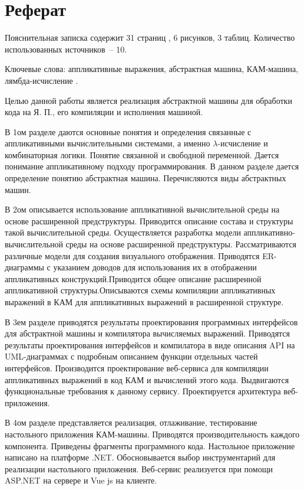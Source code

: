 \chapter*{Реферат}
\thispagestyle{plain}

Пояснительная записка содержит 31  страниц , 6 рисунков, 3 таблиц.   Количество использованных источников~-- 10.

Ключевые слова: аппликативные выражения, абстрактная машина, КАМ-машина, лямбда-исчисление .

Целью данной работы является реализация абстрактной машины для обработки кода на Я. П., его компиляции и исполнения машиной.

В 1ом разделе даются основные понятия и определения связанные с аппликативными вычислительными системами, а именно $\lambda$-исчисление и комбинаторная логики. Понятие связанной и свободной переменной.
Дается понимание аппликативному подходу программирования. В данном разделе дается определение понятию абстрактная машина. Перечисляются виды абстрактных машин.

В 2ом описывается использование аппликативной вычислительной среды на основе расширенной предструктуры. Приводится описание состава и структуры такой вычислительной среды. Осуществляется разработка модели аппликативно-вычислительной среды на основе расширенной предструктуры. Рассматриваются различные модели для создания визуального отображения. Приводятся ER-диаграммы с указанием доводов для использования их в отображении аппликативных конструкций.Приводится общее описание расширенной аппликативной структуры.Описываются схемы компиляции аппликативных выражений в КАМ для аппликативных выражений в расширенной структуре.

В 3ем разделе приводятся результаты проектирования программных интерфейсов для абстрактной машины и компилятора вычисляемых выражений. Приводятся результаты проектирования интерфейсов и компилатора в виде описания API на UML-диаграммах с подробным описанием функции отдельных частей интерфейсов. Производится проектирование веб-сервиса для компиляции аппликативных выражений в код КАМ и вычислений этого кода. Выдвигаются функциональные требования к данному сервису. Проектируется архитектура веб-приложения.

В 4ом разделе представляется реализация, отлаживание, тестирование настольного приложения КАМ-машины.
Приводятся производительность каждого компонента. Приведены фрагменты программного кода. Настольное приложение написано на платформе .NET. Обосновывается выбор инструментарий для реализации настольного приложения. Веб-сервис реализуется при помощи ASP.NET на сервере и Vue js на клиенте.
